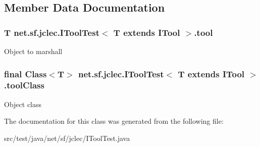 \subsection{Member Data Documentation}
\hypertarget{classnet_1_1sf_1_1jclec_1_1_i_tool_test_3_01_t_01extends_01_i_tool_01_4_ad095d35220b4ada6418bf6fbde513530}{
\subsubsection[{tool}]{\setlength{\rightskip}{0pt plus 5cm}T net.\-sf.\-jclec.\-I\-Tool\-Test$<$ T extends {\bf I\-Tool} $>$.tool\hspace{0.3cm}{\ttfamily [protected]}}}\label{classnet_1_1sf_1_1jclec_1_1_i_tool_test_3_01_t_01extends_01_i_tool_01_4_ad095d35220b4ada6418bf6fbde513530}
Object to marshall \hypertarget{classnet_1_1sf_1_1jclec_1_1_i_tool_test_3_01_t_01extends_01_i_tool_01_4_a143f51ba0029cc02e347ccadbfdf171f}{
\subsubsection[{tool\-Class}]{\setlength{\rightskip}{0pt plus 5cm}final Class$<$T$>$ net.\-sf.\-jclec.\-I\-Tool\-Test$<$ T extends {\bf I\-Tool} $>$.tool\-Class\hspace{0.3cm}{\ttfamily [protected]}}}\label{classnet_1_1sf_1_1jclec_1_1_i_tool_test_3_01_t_01extends_01_i_tool_01_4_a143f51ba0029cc02e347ccadbfdf171f}
Object class 

The documentation for this class was generated from the following file\-:\begin{DoxyCompactItemize}
\item 
src/test/java/net/sf/jclec/I\-Tool\-Test.\-java\end{DoxyCompactItemize}
